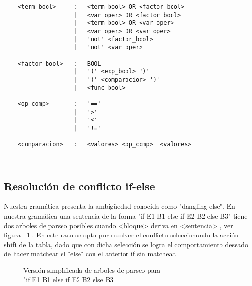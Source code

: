 \begin{verbatim}
    <term_bool>     :   <term_bool> OR <factor_bool>
                    |   <var_oper> OR <factor_bool>
                    |   <term_bool> OR <var_oper>
                    |   <var_oper> OR <var_oper>
                    |   'not' <factor_bool>
                    |   'not' <var_oper>

    <factor_bool>   :   BOOL
                    |   '(' <exp_bool> ')'
                    |   '(' <comparacion> ')'
                    |   <func_bool>

    <op_comp>       :   '=='
                    |   '>'
                    |   '<'
                    |   '!='

    <comparacion>   :   <valores> <op_comp>  <valores>

    
\end{verbatim}
\subsection{Resolución de conflicto if-else}\label{sec:pgram}
Nuestra gramática presenta la ambigüedad conocida como "dangling else". En nuestra gramática una sentencia de la forma "if E1 B1 else if E2 B2 else B3" tiene dos arboles de parseo posibles cuando <bloque> deriva en <sentencia> , ver figura ~\ref{fig:trees} .  En este caso se opto por resolver el conflicto seleccionando la acción shift de la tabla, dado que con dicha selección se logra el comportamiento deseado de hacer matchear el "else" con el anterior if sin matchear.  

\begin{figure}[H]

    \begin{subfigure}[b]{0.3\textwidth}
    \end{subfigure}
    
    \begin{subfigure}[b]{0.3\textwidth}
    \end{subfigure}
    



     \caption{Versión simplificada de arboles de parseo para \\"if E1 B1 else if E2 B2 else B3 }
      \label{fig:trees}
\end{figure}    

